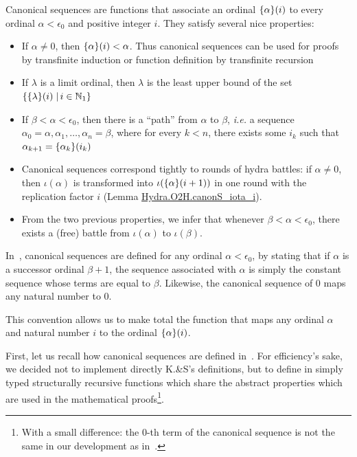 Canonical sequences are functions that associate an ordinal $\mbox{$\{\alpha\}(i)$}$ to every ordinal $\alpha<\epsilon_0$ and positive integer $i$. They satisfy several nice properties:

\begin{itemize}
\item If $\alpha\not=0$, then $\mbox{$\{\alpha\}(i)$}<\alpha$. Thus canonical sequences can be used for proofs by transfinite induction or function definition by transfinite recursion
\item If $\lambda$ is a limit ordinal, then $\lambda$ is the least upper bound of the set 
$\{\mbox{$\{\lambda\}(i)$}\;|\,i\in\mathbb{N}_1\}$


\item If $\beta<\alpha<\epsilon_0$, then there is a ``path'' from $\alpha$ to $\beta$, \emph{i.e.} a
sequence $\alpha_0=\alpha, \alpha_1, \dots, \alpha_n=\beta$, where for every $k<n$, there exists some $i_k$ such that $\alpha_{k+1}=\mbox{$\{\alpha_k\}(i_k)$}$
\item Canonical sequences correspond tightly to rounds of hydra battles: if $\alpha\not=0$,
then $\iota(\alpha)$ is transformed into $\iota(\mbox{$\{\alpha\}(i+1)$})$ in one round with
the replication factor $i$ (Lemma \href{../theories/html/hydras.Hydra.O2H.html\#canonS_iota_i}{Hydra.O2H.canonS\_iota\_i}).
\item From the two previous properties, we infer that whenever $\beta<\alpha<\epsilon_0$, there exists a (free) battle from $\iota(\alpha)$ to $\iota(\beta)$.
\end{itemize}

\begin{remark}
  In~\cite{KS81}, canonical sequences are defined for any ordinal $\alpha <\epsilon_0$,
by stating that if $\alpha$ is a successor ordinal $\beta+1$,  the sequence associated with 
$\alpha$ is simply the constant sequence whose terms are equal to $\beta$.
Likewise, the canonical sequence of $0$ maps any natural number to $0$.

This convention allows us to make total the function that maps any ordinal $\alpha$ and natural number $i$ to the ordinal $\mbox{$\{\alpha\}(i)$}$.

\end{remark}


First, let us recall how canonical sequences are defined in~\cite{KS81}. For efficiency's sake, we decided not to implement directly K.\&S's definitions, but to define in \gallina{} simply typed structurally recursive functions which share the abstract properties which are used in the mathematical proofs\footnote{With a small difference: the $0$-th term of the canonical sequence is not the same in our development as in~\cite{KS81}.}.





